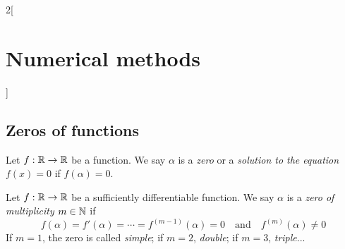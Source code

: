 \documentclass[../../../main.tex]{subfiles}
\begin{document}
\begin{multicols}{2}[\section{Numerical methods}]
\subsection{Zeros of functions}
\begin{definition}
    Let $f:\mathbb{R}\rightarrow\mathbb{R}$ be a function. We say $\alpha$ is a \textit{zero} or a \textit{solution to the equation $f(x)=0$} if $f(\alpha)=0$.
\end{definition}
\begin{definition}
    Let $f:\mathbb{R}\rightarrow\mathbb{R}$ be a sufficiently differentiable function. We say $\alpha$ is a \textit{zero of multiplicity $m\in\mathbb{N}$} if $$f(\alpha)=f'(\alpha)=\cdots=f^{(m-1)}(\alpha)=0\quad\text{and}\quad f^{(m)}(\alpha)\ne0$$ If $m=1$, the zero is called \textit{simple}; if $m=2$, \textit{double}; if $m=3$, \textit{triple}...
\end{definition}

\end{multicols}
\end{document}
